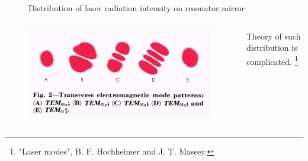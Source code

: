 \documentclass{beamer}
\begin{document}
\begin{frame}
\begin{columns}
\begin{column}{0.4\textwidth}
\begin{figure}
					\caption{\footnotesize Distribution of laser radiation intensity on resonator mirror}
				\end{figure}
			\end{column}
		\end{columns}			
		
		\vspace{-10pt}
		
		\begin{columns}
			\begin{column}{0.5\textwidth}
				\begin{figure}
					\centering
					\includegraphics[width=1\linewidth]{res/tem_patterns.png}
				\end{figure}
			\end{column}
			\begin{column}{0.4\textwidth}
				Theory of such distribution is complicated. \footnote{\;"Laser modes", B. F. Hochheimer and J. T. Massey.}
			\end{column}
		\end{columns}	
		
	\end{frame}
	
\end{document}
